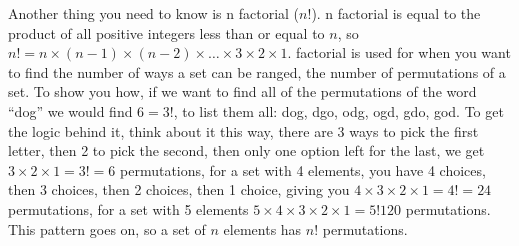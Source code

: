   Another thing you need to know is n factorial ($n!$). n factorial is equal to the product of all positive integers less than or equal to $n$, so $n!=n \times (n-1) \times (n-2) \times \dots \times 3 \times 2 \times 1$. factorial is used for when you want to find the number of ways a set can be ranged, the number of permutations of a set. To show you how, if we want to find all of the permutations of the word ``dog'' we would find $6=3!$, to list them all: dog, dgo, odg, ogd, gdo, god. To get the logic behind it, think about it this way, there are 3 ways to pick the first letter, then 2 to pick the second, then only one option left for the last, we get $3 \times 2 \times 1 = 3! = 6$ permutations, for a set with 4 elements, you have 4 choices, then 3 choices, then 2 choices, then 1 choice, giving you $4 \times 3 \times 2 \times 1 =  4! = 24$ permutations, for a set with 5 elements $5 \times 4 \times 3 \times 2 \times 1 = 5! 120$ permutations. This pattern goes on, so a set of $n$ elements has $n!$ permutations.
  
